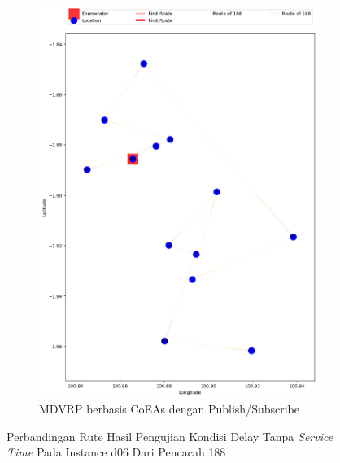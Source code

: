 \begin{figure}[H]\ContinuedFloat
	\centering
	\begin{subfigure}[t]{\textwidth}
		\centering
		\includegraphics[width=\textwidth]{Resources/Images/delayed_6/real_m15_n100_delayed_6_188_pubsub_coes}
		\caption{MDVRP berbasis CoEAs dengan Publish/Subscribe}
		\label{fig:real_m15_n100_delayed_6_188_pubsub_coes}
	\end{subfigure}
	\caption{Perbandingan Rute Hasil Pengujian Kondisi Delay Tanpa \textit{Service Time} Pada Instance d06 Dari Pencacah 188}
	\label{fig:real_m15_n100_delayed_6_188_contd}
\end{figure}


